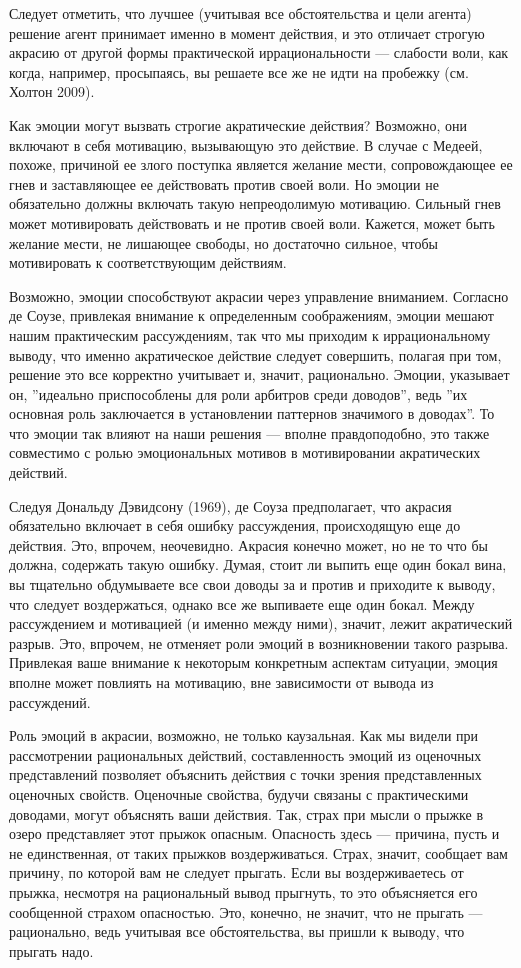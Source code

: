 \documentclass[11pt]{book}
\begin{document}
\smallskip

Следует отметить, что лучшее (учитывая все обстоятельства и цели агента) решение агент принимает именно в момент действия, и это отличает строгую акрасию от другой формы практической иррациональности --- слабости воли, как когда, например, просыпаясь, вы решаете все же не идти на пробежку (см. Холтон 2009).

Как эмоции могут вызвать строгие акратические действия? Возможно, они включают в себя мотивацию, вызывающую это действие. В случае с Медеей, похоже, причиной ее злого поступка является желание мести, сопровождающее ее гнев и заставляющее ее действовать против своей воли. Но эмоции не обязательно должны включать такую непреодолимую мотивацию. Сильный гнев может мотивировать действовать и не против своей воли. Кажется, может быть желание мести, не лишающее свободы, но достаточно сильное, чтобы мотивировать к соответствующим действиям.

Возможно, эмоции способствуют акрасии через управление вниманием. Согласно де Соузе, привлекая внимание к определенным соображениям, эмоции мешают нашим практическим рассуждениям, так что мы приходим к иррациональному выводу, что именно акратическое действие следует совершить, полагая при том, решение это все корректно учитывает и, значит, рационально. Эмоции, указывает он, ''идеально приспособлены для роли арбитров среди доводов'', ведь ''их основная роль заключается в установлении паттернов значимого в доводах''. То что эмоции так влияют на наши решения --- вполне правдоподобно, это также совместимо с ролью эмоциональных мотивов в мотивировании акратических действий.

Следуя Дональду Дэвидсону (1969), де Соуза предполагает, что акрасия обязательно включает в себя ошибку рассуждения, происходящую еще до действия. Это, впрочем, неочевидно. Акрасия конечно может, но не то что бы должна, содержать такую ошибку. Думая, стоит ли выпить еще один бокал вина, вы тщательно обдумываете все свои доводы за и против и приходите к выводу, что следует воздержаться, однако все же выпиваете еще один бокал. Между рассуждением и мотивацией (и именно между ними), значит, лежит акратический разрыв. Это, впрочем, не отменяет роли эмоций в возникновении такого разрыва. Привлекая ваше внимание к некоторым конкретным аспектам ситуации, эмоция вполне может повлиять на мотивацию, вне зависимости от вывода из рассуждений.

Роль эмоций в акрасии, возможно, не только каузальная. Как мы видели при рассмотрении рациональных действий, составленность эмоций из оценочных представлений позволяет объяснить действия с точки зрения представленных оценочных свойств. Оценочные свойства, будучи связаны с практическими доводами, могут объяснять ваши действия. Так, страх при мысли о прыжке в озеро представляет этот прыжок опасным. Опасность здесь --- причина, пусть и не единственная, от таких прыжков воздерживаться. Страх, значит, сообщает вам причину, по которой вам не следует прыгать. Если вы воздерживаетесь от прыжка, несмотря на рациональный вывод прыгнуть, то это объясняется его сообщенной страхом опасностью. Это, конечно, не значит, что не прыгать --- рационально, ведь учитывая все обстоятельства, вы пришли к выводу, что прыгать надо.
\end{document}
